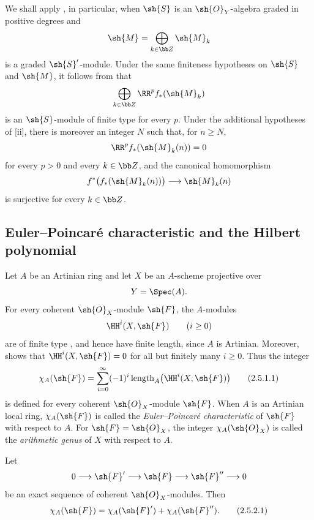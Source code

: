 \begin{env}[2.4.2]
\label{III.2.4.2}
We shall apply , in particular, when $\sh{S}$ is an $\sh{O}_Y$-algebra graded in positive degrees and
\[
  \sh{M}=\bigoplus_{k\in\bb Z}\sh{M}_k
\]
is a graded $\sh{S}'$-module.
Under the same finiteness hypotheses on $\sh{S}$ and $\sh{M}$, it follows from  that
\[
  \bigoplus_{k\in\bb Z}\RR^p f_*(\sh{M}_k)
\]
is an $\sh{S}$-module of finite type for every $p$.
Under the additional hypotheses of [ii], there is moreover an integer $N$ such that, for $n\geq N$,
\[
  \RR^p f_*(\sh{M}_k(n))=0
\]
for every $p>0$ and every $k\in\bb Z$, and the canonical homomorphism
\[
  f^*\bigl(f_*(\sh{M}_k(n))\bigr)
  \longrightarrow
  \sh{M}_k(n)
\]
is surjective for every $k\in\bb Z$.
\end{env}


\subsection{Euler--Poincar\'e characteristic and the Hilbert polynomial}
\label{subsection:III.2.5}

\begin{env}[2.5.1]
\label{III.2.5.1}
Let $A$ be an Artinian ring and let $X$ be an $A$-scheme projective over
\[
  Y=\Spec(A).
\]
For every coherent $\sh{O}_X$-module $\sh{F}$, the $A$-modules
\[
  \HH^i(X,\sh{F})\qquad(i\geq0)
\]
are of finite type , and hence have finite length, since $A$ is Artinian.
Moreover,  shows that $\HH^i(X,\sh{F})=0$ for all but finitely many $i\geq0$.
Thus the integer
\[
\label{III.2.5.1.1}
  \chi_A(\sh{F})
  =
  \sum_{i=0}^{\infty}
  (-1)^i\operatorname{length}_A\bigl(\HH^i(X,\sh{F})\bigr)
  \tag{2.5.1.1}
\]
is defined for every coherent $\sh{O}_X$-module $\sh{F}$.
When $A$ is an Artinian local ring, $\chi_A(\sh{F})$ is called the \emph{Euler--Poincar\'e characteristic} of $\sh{F}$ with respect to $A$.
For $\sh{F}=\sh{O}_X$, the integer $\chi_A(\sh{O}_X)$ is called the \emph{arithmetic genus} of $X$ with respect to $A$.
\end{env}

\begin{proposition}[2.5.2]
\label{III.2.5.2}
Let
\[
  0\longrightarrow\sh{F}'
  \longrightarrow\sh{F}
  \longrightarrow\sh{F}''
  \longrightarrow0
\]
be an exact sequence of coherent $\sh{O}_X$-modules.
Then
\[
\label{III.2.5.2.1}
  \chi_A(\sh{F})
  =
  \chi_A(\sh{F}')+\chi_A(\sh{F}'').
  \tag{2.5.2.1}
\]
\end{proposition}

